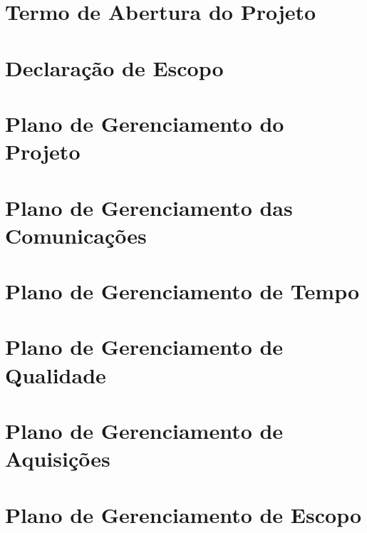 \begin{anexosenv}

\partanexos

\chapter{Termo de Abertura do Projeto}

  
  
\chapter{Declaração de Escopo}

  

\chapter{Plano de Gerenciamento do Projeto}

  
  
\chapter{Plano de Gerenciamento das Comunicações}

  

\chapter{Plano de Gerenciamento de Tempo}

  

\chapter{Plano de Gerenciamento de Qualidade}

  
  
\chapter{Plano de Gerenciamento de Aquisições}

  

\chapter{Plano de Gerenciamento de Escopo}


\end{anexosenv}
